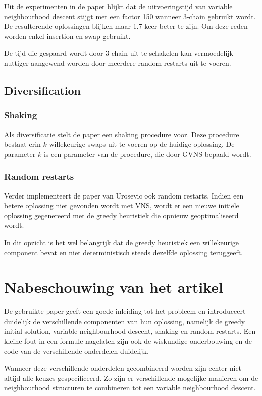 \documentclass[pdftex,12pt,a4paper]{article}
\begin{document}
Uit de experimenten in de paper blijkt dat de uitvoeringstijd van variable neighbourhood descent stijgt met een factor 150 wanneer 3-chain gebruikt wordt. 
De resulterende oplossingen blijken maar 1.7 keer beter te zijn.
Om deze reden worden enkel insertion en swap gebruikt. 

De tijd die gespaard wordt door 3-chain uit te schakelen kan vermoedelijk nuttiger aangewend worden door meerdere random restarts uit te voeren.

\subsection{Diversification}
\subsubsection{Shaking}
Als diversificatie stelt de paper een shaking procedure voor.
Deze procedure bestaat erin $k$ willekeurige swaps uit te voeren op de huidige oplossing. 
De parameter $k$ is een parameter van de procedure, die door GVNS bepaald wordt.

\subsubsection{Random restarts}
Verder implementeert de paper van Urosevic\cite{Urosevic} ook random restarts. Indien een betere oplossing niet gevonden wordt met VNS, wordt er een nieuwe initi\"ele oplossing gegenereerd met de greedy heuristiek die opnieuw geoptimaliseerd wordt.

In dit opzicht is het wel belangrijk dat de greedy heuristiek een willekeurige component bevat en niet deterministisch steeds dezelfde oplossing teruggeeft.

\section{Nabeschouwing van het artikel}
De gebruikte paper geeft een goede inleiding tot het probleem en introduceert duidelijk de verschillende componenten van hun oplossing, namelijk de greedy initial solution, variable neighbourhood descent, shaking en random restarts.
Een kleine fout in een formule nagelaten zijn ook de wiskundige onderbouwing en de code van de verschillende onderdelen duidelijk.

Wanneer deze verschillende onderdelen gecombineerd worden zijn echter niet altijd alle keuzes gespecificeerd.
Zo zijn er verschillende mogelijke manieren om de neighbourhood structuren te combineren tot een variable neighbourhood descent.
\end{document}
